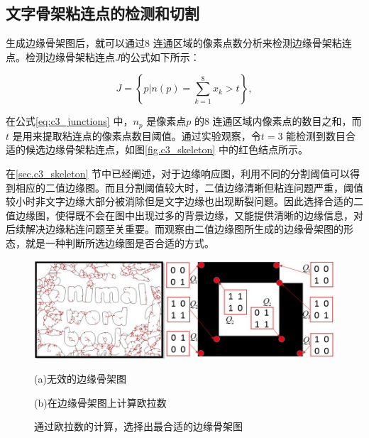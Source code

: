         \subsection{文字骨架粘连点的检测和切割}
        \label{sec.c3_skeleton_cut}

        生成边缘骨架图后，就可以通过8 连通区域的像素点数分析来检测边缘骨架粘连点。检测边缘骨架粘连点$J$的公式如下所示：

        \begin{equation}
        J=\left\{ p|n(p)=\sum_{k=1}^8x_k>t \right\},
        \label{eq:c3_junctions}
        \end{equation}

        在公式\ref{eq:c3_junctions} 中，$n_p$ 是像素点$p$ 的8 连通区域内像素点的数目之和，而$t$ 是用来提取粘连点的像素点数目阈值。通过实验观察，令$t = 3$ 能检测到数目合适的候选边缘骨架粘连点，如图\ref{fig.c3_skeleton} 中的红色结点所示。

        在\ref{sec.c3_skeleton} 节中已经阐述，对于边缘响应图，利用不同的分割阈值可以得到相应的二值边缘图。而且分割阈值较大时，二值边缘清晰但粘连问题严重，阈值较小时非文字边缘大部分被消除但是文字边缘也出现断裂问题。因此选择合适的二值边缘图，使得既不会在图中出现过多的背景边缘，又能提供清晰的边缘信息，对后续解决边缘粘连问题至关重要。而观察由二值边缘图所生成的边缘骨架图的形态，就是一种判断所选边缘图是否合适的方式。

        \begin{figure}[htbp]
        \centering
        \includegraphics[width=\textwidth]{./figures/c3_select_skeleton.jpg}
        \begin{minipage}[t]{0.48\linewidth}
        \centerline{\small (a)无效的边缘骨架图}
        \end{minipage}
        \begin{minipage}[t]{0.48\linewidth}
        \centerline{\small (b)在边缘骨架图上计算欧拉数}
        \end{minipage}
        \caption{通过欧拉数的计算，选择出最合适的边缘骨架图}
        \label{fig.c3_select_skeleton}
        \end{figure}

